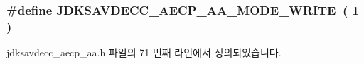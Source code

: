 \subsubsection[{\texorpdfstring{J\+D\+K\+S\+A\+V\+D\+E\+C\+C\+\_\+\+A\+E\+C\+P\+\_\+\+A\+A\+\_\+\+M\+O\+D\+E\+\_\+\+W\+R\+I\+TE}{JDKSAVDECC_AECP_AA_MODE_WRITE}}]{\setlength{\rightskip}{0pt plus 5cm}\#define J\+D\+K\+S\+A\+V\+D\+E\+C\+C\+\_\+\+A\+E\+C\+P\+\_\+\+A\+A\+\_\+\+M\+O\+D\+E\+\_\+\+W\+R\+I\+TE~( 1 )}\hypertarget{group___a_e_c_p___a_a__mode_ga48146a7fbc4b80b2687845c1bae1fd02}{}\label{group___a_e_c_p___a_a__mode_ga48146a7fbc4b80b2687845c1bae1fd02}


jdksavdecc\+\_\+aecp\+\_\+aa.\+h 파일의 71 번째 라인에서 정의되었습니다.

